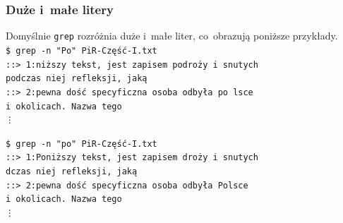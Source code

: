 \documentclass[10pt,t]{beamer}
\begin{document}
\begin{frame}
  \frametitle{Duże i~małe litery}


  Domyślnie \texttt{grep} rozróżnia duże i~małe liter, co~obrazują poniższe
  przykłady. \\
  \texttt{\$ grep -n "Po"{} PiR-Część-I.txt} \\
  \texttt{::> 1:niższy tekst, jest zapisem podroży
    i~snutych} \\
  \texttt{podczas niej refleksji, jaką} \\
  \texttt{::> 2:pewna dość specyficzna osoba odbyła
    po~lsce} \\
  \texttt{i~okolicach. Nazwa tego} \\
  \hspace{2em} \texttt{\vdots}

  \texttt{\$ grep -n "po"{} PiR-Część-I.txt} \\
  \texttt{::> 1:Poniższy tekst, jest zapisem droży
    i~snutych} \\
  \texttt{dczas niej refleksji, jaką} \\
  \texttt{::> 2:pewna dość specyficzna osoba odbyła 
    Polsce} \\
  \texttt{i~okolicach. Nazwa tego} \\
  \hspace{2em} \texttt{\vdots}

\end{frame}
\end{document}
